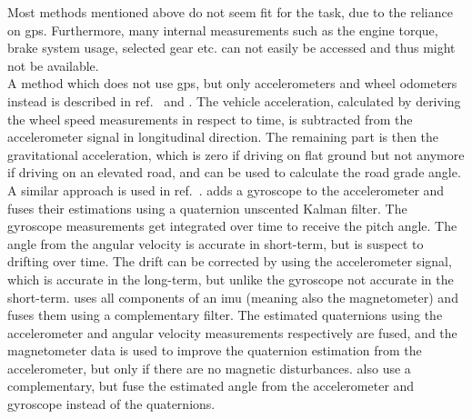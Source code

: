 Most methods mentioned above do not seem fit for the task, due to the reliance on \gls{gps}.
Furthermore, many internal measurements such as the engine torque, brake system usage, selected gear etc. can not easily be accessed and thus might not be available.\\
A method which does not use \gls{gps}, but only accelerometers and wheel odometers instead is described in ref.~\cite{Nilsson2012} and \cite{Palella2016}.
The vehicle acceleration, calculated by deriving the wheel speed measurements in respect to time, is subtracted from the accelerometer signal in longitudinal direction.
The remaining part is then the gravitational acceleration, which is zero if driving on flat ground but not anymore if driving on an elevated road, and can be used to calculate the road grade angle.
A similar approach is used in ref.~\cite{Sentouh2008}.
\cite{He2020} adds a gyroscope to the accelerometer and fuses their estimations using a quaternion unscented Kalman filter.
The gyroscope measurements get integrated over time to receive the pitch angle.
The angle from the angular velocity is accurate in short-term, but is suspect to drifting over time.
The drift can be corrected by using the accelerometer signal, which is accurate in the long-term, but unlike the gyroscope not accurate in the short-term.
\cite{Wu2016} uses all components of an \gls{imu} (meaning also the magnetometer) and fuses them using a complementary filter.
The estimated quaternions using the accelerometer and angular velocity measurements respectively are fused, and the magnetometer data is used to improve the quaternion estimation from the accelerometer, but only if there are no magnetic disturbances.
\cite{Euston2008,Jauch2018} also use a complementary, but fuse the estimated angle from the accelerometer and gyroscope instead of the quaternions.




